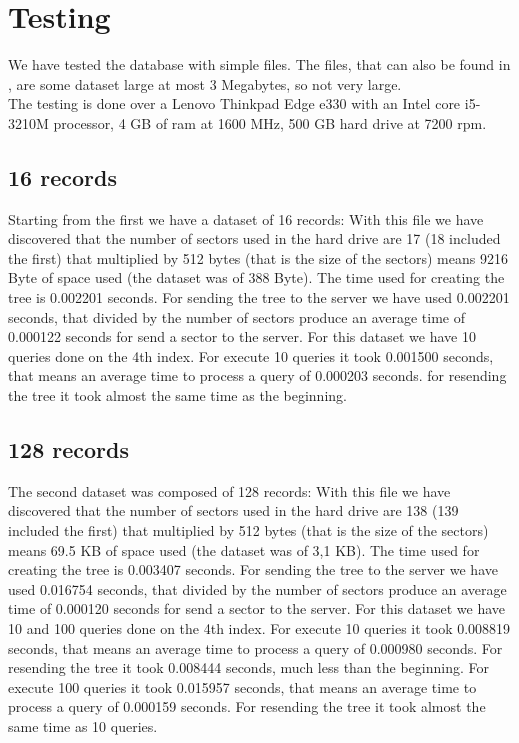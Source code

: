 \section{Testing}
We have tested the database with simple files.
The files, that can also be found in \cite{source}, are some dataset large at most 3 Megabytes, so not very large.\\
The testing is done over a Lenovo Thinkpad Edge e330 with an Intel core i5-3210M processor, 4 GB of ram at 1600 MHz, 500 GB hard drive at 7200 rpm.

\subsection{16 records}
Starting from the first we have a dataset of 16 records:
With this file we have discovered that the number of sectors used in the hard drive are 17 (18 included the first) that multiplied by 512 bytes (that is the size of the sectors) means 9216 Byte of space used (the dataset was of 388 Byte).
The time used for creating the tree is 0.002201 seconds.
For sending the tree to the server we have used  0.002201 seconds, that divided by the number of sectors produce an average time of 0.000122 seconds for send a sector to the server.
For this dataset we have 10 queries done on the 4th index. 
For execute 10 queries it took 0.001500 seconds, that means an average time to process a query of 0.000203 seconds.
for resending the tree it took almost the same time as the beginning.


\subsection{128 records}
The second dataset was composed of 128 records:
With this file we have discovered that the number of sectors used in the hard drive are 138 (139 included the first) that multiplied by 512 bytes (that is the size of the sectors) means 69.5 KB of space used (the dataset was of 3,1 KB).
The time used for creating the tree is 0.003407 seconds.
For sending the tree to the server we have used 0.016754 seconds, that divided by the number of sectors produce an average time of 0.000120 seconds for send a sector to the server.
For this dataset we have 10 and 100 queries done on the 4th index. 
For execute 10 queries it took 0.008819 seconds, that means an average time to process a query of 0.000980 seconds.
For resending the tree it took 0.008444 seconds, much less than the beginning.
For execute 100 queries it took 0.015957 seconds, that means an average time to process a query of 0.000159 seconds.
For resending the tree it took almost the same time as 10 queries.


